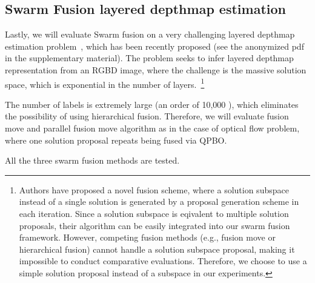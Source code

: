 \subsection{Swarm Fusion layered depthmap estimation}
Lastly, we will evaluate Swarm fusion on a very challenging layered
depthmap estimation problem~\cite{layered_depthmap}, which has been
recently proposed (see the anonymized pdf in the supplementary
material). The problem seeks to infer layered depthmap representation
from an RGBD image, where the challenge is the massive solution space,
which is exponential in the number of layers.~\footnote{Authors have
proposed a novel fusion scheme, where a solution subspace instead of a
single solution is generated by a proposal generation scheme in each
iteration. Since a solution subspace is eqivalent to multiple solution
proposals, their algorithm can be easily integrated into our swarm
fusion framework.  However, competing fusion methods (e.g., fusion move
or hierarchical fusion) cannot handle a solution subspace proposal,
making it impossible to conduct comparative evaluations. Therefore, we
choose to use a simple solution proposal instead of a subspace in our experiments.}

The number of labels is extremely large (an order of 10,000 ), which eliminates the
possibility of using hierarchical fusion. Therefore, we will evaluate
fusion move and parallel fusion move algorithm as in the case of optical
flow problem, where one solution proposal repeats being fused via QPBO.


All the three swarm fusion methods are tested.
